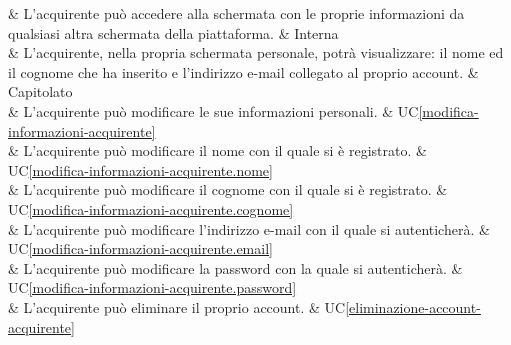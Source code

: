  & L'acquirente può accedere alla schermata con le proprie informazioni da qualsiasi altra schermata della piattaforma. & Interna \\

 & L'acquirente, nella propria schermata personale, potrà visualizzare: il nome ed il cognome che ha inserito e l'indirizzo e-mail collegato al proprio account. & Capitolato \\

 & L'acquirente può modificare le sue informazioni personali. & UC\ref{modifica-informazioni-acquirente} \\

 & L'acquirente può modificare il nome con il quale si è registrato. & UC\ref{modifica-informazioni-acquirente.nome} \\

 & L'acquirente può modificare il cognome con il quale si è registrato. & UC\ref{modifica-informazioni-acquirente.cognome} \\

 & L'acquirente può modificare l'indirizzo e-mail con il quale si autenticherà. & UC\ref{modifica-informazioni-acquirente.email} \\

 & L'acquirente può modificare la password con la quale si autenticherà. & UC\ref{modifica-informazioni-acquirente.password} \\

 & L'acquirente può eliminare il proprio account. & UC\ref{eliminazione-account-acquirente} \\
